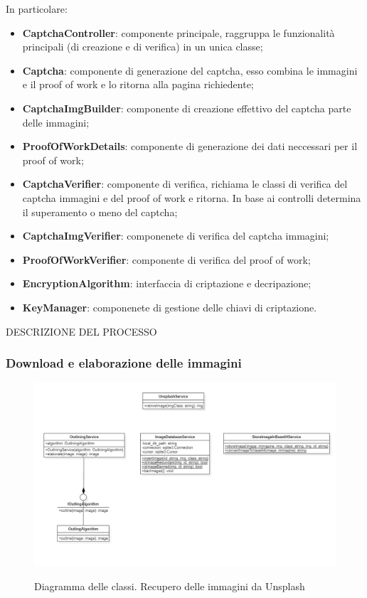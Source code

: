 In particolare:
\begin{itemize}
    \item \textbf{CaptchaController}: componente principale, raggruppa le funzionalità principali (di creazione e di verifica) in un unica classe;
    \item \textbf{Captcha}: componente di generazione del captcha, esso combina le immagini e il proof of work e lo ritorna alla pagina richiedente;
    \item \textbf{CaptchaImgBuilder}: componente di creazione effettivo del captcha parte delle immagini;
    \item \textbf{ProofOfWorkDetails}: componente di generazione dei dati neccessari per il proof of work;
    \item \textbf{CaptchaVerifier}: componente di verifica, richiama le classi di verifica del captcha immagini e del proof of work e ritorna. In base ai controlli determina il superamento o meno del captcha;
    \item \textbf{CaptchaImgVerifier}: componenete di verifica del captcha immagini;
    \item \textbf{ProofOfWorkVerifier}: componente di verifica del proof of work;
    \item \textbf{EncryptionAlgorithm}: interfaccia di criptazione e decripazione;
    \item \textbf{KeyManager}: componenete di gestione delle chiavi di criptazione.
\end{itemize}

DESCRIZIONE DEL PROCESSO

\subsubsection{Download e elaborazione delle immagini}

\begin{landscape}
\begin{figure}[H]
    \centering
    \includegraphics[scale = 0.4]{img/downloadImg.png}\\
    \caption{Diagramma delle classi. Recupero delle immagini da Unsplash}
\end{figure}
\end{landscape}

